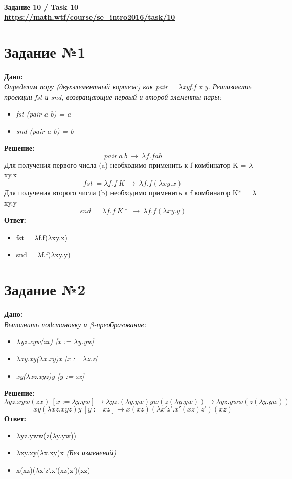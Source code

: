 \documentclass[a4paper,portrait,12pt]{article}
\begin{document}
\begin{center}
\large\textbf{Задание 10 / Task 10 \\ \url{https://math.wtf/course/se_intro2016/task/10}}
\end{center}
\section*{Задание №1}
\textbf{Дано:}\\
\textit{Определим пару (двухэлементный кортеж) как pair = $\lambda$xyf.f x y. Реализовать проекции fst и snd, возвращающие первый и второй элементы пары:}
\begin{itemize}
\item \textit{fst (pair a b) = a}
\item \textit{snd (pair a b) = b}
\end{itemize}
\textbf{Решение:}
\[pair\ a\ b \ {\to}\  {\lambda}f.f a b\]
Для получения первого числа (a) необходимо применить к f комбинатор K = $\lambda$xy.x
\[fst\ = {\lambda}f.f\ K \ {\to}\   {\lambda}f.f({\lambda}xy.x) \]
Для получения второго числа (b) необходимо применить к f комбинатор K* = $\lambda$xy.y
\[snd\ = {\lambda}f.f\ K* \ {\to}\   {\lambda}f.f({\lambda}xy.y) \]
\textbf{Ответ:}
\begin{itemize}
\item fst = $\lambda$f.f($\lambda$xy.x)
\item snd = $\lambda$f.f($\lambda$xy.y)
\end{itemize}
\section*{Задание №2}
\textbf{Дано:}\\
\textit{Выполнить подстановку и $\beta$-преобразование:}
\begin{itemize}
\item \textit{$\lambda$yz.xyw(zx)     [x := $\lambda$y.yw]}
\item \textit{$\lambda$xy.xy($\lambda$x.xy)x  [x := $\lambda$z.z]}
\item \textit{xy($\lambda$xz.xyz)y    [y := xz]}
\end{itemize}
\textbf{Решение:}
\[{\lambda}yz.xyw(zx)\ [x := {\lambda}y.yw] \to {\lambda}yz.({\lambda}y.yw)yw(z({\lambda}y.yw)) \to {\lambda}yz.yww(z({\lambda}y.yw)) \]
\[xy({\lambda}xz.xyz)y\ [y := xz] \to x(xz)({\lambda}x'z'.x'(xz)z')(xz)\]
\textbf{Ответ:}
\begin{itemize}
\item $\lambda$yz.yww(z($\lambda$y.yw))
\item $\lambda$xy.xy($\lambda$x.xy)x \textit{(Без изменений)}
\item x(xz)($\lambda$x'z'.x'(xz)z')(xz)
\end{itemize}
\end{document}
